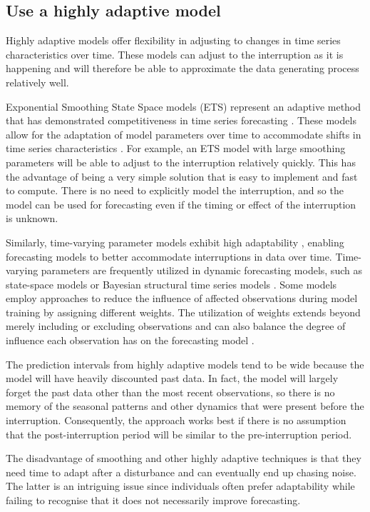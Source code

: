 \documentclass[
  11pt,
  a4paper,
]{article}
\begin{document}
\subsection{Use a highly adaptive
model}\label{use-a-highly-adaptive-model}

Highly adaptive models offer flexibility in adjusting to changes in time
series characteristics over time. These models can adjust to the
interruption as it is happening and will therefore be able to
approximate the data generating process relatively well.

Exponential Smoothing State Space models (ETS) represent an adaptive
method that has demonstrated competitiveness in time series forecasting
\autocite{gardner2006exponential}. These models allow for the adaptation
of model parameters over time to accommodate shifts in time series
characteristics \autocite{hyndman2002state}. For example, an ETS model
with large smoothing parameters will be able to adjust to the
interruption relatively quickly. This has the advantage of being a very
simple solution that is easy to implement and fast to compute. There is
no need to explicitly model the interruption, and so the model can be
used for forecasting even if the timing or effect of the interruption is
unknown.

Similarly, time-varying parameter models exhibit high adaptability
\autocite{harvey2006forecasting}, enabling forecasting models to better
accommodate interruptions in data over time. Time-varying parameters are
frequently utilized in dynamic forecasting models, such as state-space
models or Bayesian structural time series models
\autocite{talih2005structural}. Some models employ approaches to reduce
the influence of affected observations during model training by
assigning different weights. The utilization of weights extends beyond
merely including or excluding observations and can also balance the
degree of influence each observation has on the forecasting model
\autocite{khoshgoftaar2007empirical}.

The prediction intervals from highly adaptive models tend to be wide
because the model will have heavily discounted past data. In fact, the
model will largely forget the past data other than the most recent
observations, so there is no memory of the seasonal patterns and other
dynamics that were present before the interruption. Consequently, the
approach works best if there is no assumption that the post-interruption
period will be similar to the pre-interruption period.

The disadvantage of smoothing and other highly adaptive techniques is
that they need time to adapt after a disturbance and can eventually end
up chasing noise. The latter is an intriguing issue since individuals
often prefer adaptability while failing to recognise that it does not
necessarily improve forecasting.
\end{document}
